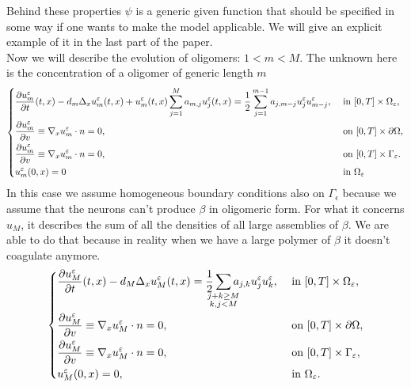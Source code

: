 Behind these properties $\psi $ is a generic given function that should be specified in some way if one wants to make the model applicable. We will give an explicit example of it in the last part of the paper.\\
Now we will describe the evolution of oligomers: $1<m<M$. The unknown here is the concentration of a oligomer of generic length $m$
\begin{equation}
    \begin{dcases}
        \frac{\partial u_{m}^{\epsilon}}{\partial t}(t, x)-d_{m} \Delta_{x} u_{m}^{\epsilon}(t, x)+u_{m}^{\epsilon}(t, x) \sum_{j=1}^{M} a_{m, j} u_{j}^{\epsilon}(t, x)= \frac{1}{2} \sum_{j=1}^{m-1} a_{j, m-j} u_{j}^{\epsilon} u_{m-j}^{\epsilon}, & \text { in }[0, T] \times \Omega_{\epsilon},\\
        \frac{\partial u_{m}^{\epsilon}}{\partial v} \equiv \nabla_{x} u_{m}^{\epsilon} \cdot n=0,  & \text { on }[0, T]\times\partial\Omega, \\
        \frac{\partial u_{m}^{\epsilon}}{\partial v} \equiv \nabla_{x} u_{m}^{\epsilon} \cdot n=0, & \text { on }[0, T]\times\Gamma_{\epsilon}.\\ 
     u_{m}^{\epsilon}(0, x)=0 & \text{ in } \Omega_{\epsilon}
    \end{dcases}
\label{eq:u_m_eqs}\end{equation}
In this case we assume homogeneous boundary conditions also on $\Gamma_{\epsilon}$ because we assume that the neurons can't produce \(\beta\) in oligomeric form.
For what it concerns $u_{M}$, it describes the sum of all the densities of all large assemblies of \(\beta\). We are able to do that because in reality when we have a large polymer of \(\beta\) it doesn't  coagulate anymore. 
\begin{equation}
    \begin{dcases}
        \frac{\partial u_{M}^{\epsilon}}{\partial t}(t, x)-d_{M} \Delta_{x} u_{M}^{\epsilon}(t, x)= \frac{1}{2} \sum_{\mathclap{\substack{j+k\geq M\\k,j<M}}} a_{j, k} u_{j}^{\epsilon} u_{k}^{\epsilon}, & \text { in }[0, T] \times \Omega_{\epsilon},\\
        \frac{\partial u_{M}^{\epsilon}}{\partial v} \equiv \nabla_{x} u_{M}^{\epsilon} \cdot n=0,  & \text { on }[0, T]\times\partial\Omega,
        \\
        \frac{\partial u_{M}^{\epsilon}}{\partial v} \equiv \nabla_{x} u_{M}^{\epsilon} \cdot n=0, & \text { on }[0, T]\times\Gamma_{\epsilon},\\ 
        u_{M}^{\epsilon}(0, x)=0, & \text{ in }\Omega_{\epsilon}.
    \end{dcases}
    \label{eq:u_M_eqs}
\end{equation}
